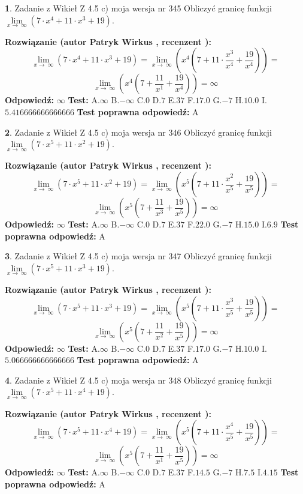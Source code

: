 \documentclass[12pt, a4paper]{article}
\theoremstyle{definition} %
\newtheorem{zad}{}
\newcommand{\zadStart}[1]{\begin{zad}#1\newline}
\newcommand{\zadStop}{\end{zad}}
\newcommand{\rozwStart}[2]{\noindent \textbf{Rozwiązanie (autor #1 , recenzent #2): }\newline}
\newcommand{\rozwStop}{\newline}
\newcommand{\odpStart}{\noindent \textbf{Odpowiedź:}\newline}
\newcommand{\odpStop}{\newline}
\newcommand{\testStart}{\noindent \textbf{Test:}\newline}
\newcommand{\testStop}{\newline}
\newcommand{\kluczStart}{\noindent \textbf{Test poprawna odpowiedź:}\newline}
\newcommand{\kluczStop}{\newline}
\begin{document}
\zadStart{Zadanie z Wikieł Z 4.5 c) moja wersja nr 345}
Obliczyć granicę funkcji  $\lim\limits_{x\to\ \infty}(7 \cdot x^{4}+11 \cdot x^{3}+19)$.
\zadStop
\rozwStart{Patryk Wirkus}{}
$$\lim\limits_{x\to\ \infty}(7 \cdot x^{4}+11 \cdot x^{3}+19) = \lim\limits_{x\to\ \infty}(x^{4}(7 +11 \cdot \frac{x^{3}}{x^{4}}+\frac{19}{x^{4}})) =$$ $$\lim\limits_{x\to\ \infty}(x^{4}(7 +\frac{11}{x^{1}}+\frac{19}{x^{4}})) =\infty$$
\rozwStop
\odpStart
$\infty$
\odpStop
\testStart
A.$\infty$ B.$-\infty$ C.$0$ D.$7$ E.$37$
F.$17.0$ G.$-7$
H.$10.0$
I.$5.416666666666666$
\testStop
\kluczStart
A
\kluczStop



\zadStart{Zadanie z Wikieł Z 4.5 c) moja wersja nr 346}
Obliczyć granicę funkcji  $\lim\limits_{x\to\ \infty}(7 \cdot x^{5}+11 \cdot x^{2}+19)$.
\zadStop
\rozwStart{Patryk Wirkus}{}
$$\lim\limits_{x\to\ \infty}(7 \cdot x^{5}+11 \cdot x^{2}+19) = \lim\limits_{x\to\ \infty}(x^{5}(7 +11 \cdot \frac{x^{2}}{x^{5}}+\frac{19}{x^{5}})) =$$ $$\lim\limits_{x\to\ \infty}(x^{5}(7 +\frac{11}{x^{3}}+\frac{19}{x^{5}})) =\infty$$
\rozwStop
\odpStart
$\infty$
\odpStop
\testStart
A.$\infty$ B.$-\infty$ C.$0$ D.$7$ E.$37$
F.$22.0$ G.$-7$
H.$15.0$
I.$6.9$
\testStop
\kluczStart
A
\kluczStop



\zadStart{Zadanie z Wikieł Z 4.5 c) moja wersja nr 347}
Obliczyć granicę funkcji  $\lim\limits_{x\to\ \infty}(7 \cdot x^{5}+11 \cdot x^{3}+19)$.
\zadStop
\rozwStart{Patryk Wirkus}{}
$$\lim\limits_{x\to\ \infty}(7 \cdot x^{5}+11 \cdot x^{3}+19) = \lim\limits_{x\to\ \infty}(x^{5}(7 +11 \cdot \frac{x^{3}}{x^{5}}+\frac{19}{x^{5}})) =$$ $$\lim\limits_{x\to\ \infty}(x^{5}(7 +\frac{11}{x^{2}}+\frac{19}{x^{5}})) =\infty$$
\rozwStop
\odpStart
$\infty$
\odpStop
\testStart
A.$\infty$ B.$-\infty$ C.$0$ D.$7$ E.$37$
F.$17.0$ G.$-7$
H.$10.0$
I.$5.066666666666666$
\testStop
\kluczStart
A
\kluczStop



\zadStart{Zadanie z Wikieł Z 4.5 c) moja wersja nr 348}
Obliczyć granicę funkcji  $\lim\limits_{x\to\ \infty}(7 \cdot x^{5}+11 \cdot x^{4}+19)$.
\zadStop
\rozwStart{Patryk Wirkus}{}
$$\lim\limits_{x\to\ \infty}(7 \cdot x^{5}+11 \cdot x^{4}+19) = \lim\limits_{x\to\ \infty}(x^{5}(7 +11 \cdot \frac{x^{4}}{x^{5}}+\frac{19}{x^{5}})) =$$ $$\lim\limits_{x\to\ \infty}(x^{5}(7 +\frac{11}{x^{1}}+\frac{19}{x^{5}})) =\infty$$
\rozwStop
\odpStart
$\infty$
\odpStop
\testStart
A.$\infty$ B.$-\infty$ C.$0$ D.$7$ E.$37$
F.$14.5$ G.$-7$
H.$7.5$
I.$4.15$
\testStop
\kluczStart
A
\kluczStop
\end{document}
